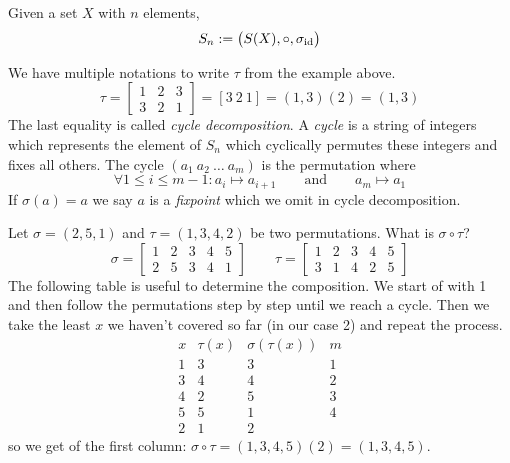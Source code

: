 \begin{definition}
   Given a set \(X\) with \(n\) elements,
   \[S_n := \big(S(X), \circ, \sigma_{\operatorname{id}}\big)\]
\end{definition}
\begin{remark}[Notation]
   We have multiple notations to write \(\tau\) from the example above.
   \[\tau = \begin{bmatrix}
         1 & 2 & 3\\
         3 & 2 & 1
   \end{bmatrix} = [3~2~1] = (1,3)(2) = (1,3)\]
   The last equality is called \emph{cycle decomposition}.
   A \emph{cycle} is a string of integers which represents the element of \(S_n\) which cyclically permutes these integers and fixes all others.
   The cycle \((a_1~a_2~\ldots~a_m)\) is the permutation where
   \[\forall 1 \leq i \leq m-1: a_i \mapsto a_{i+1} \qquad\text{and}\qquad a_m \mapsto a_1\]
   If \(\sigma(a) = a\) we say \(a\) is a \emph{fixpoint} which we omit in cycle decomposition.
\end{remark}
\begin{example}
   Let \(\sigma = (2, 5, 1)\) and \(\tau = (1, 3, 4, 2)\) be two permutations.
   What is \(\sigma \circ \tau\)?
      \[\sigma = \begin{bmatrix}1&2&3&4&5\\2&5&3&4&1\end{bmatrix} \qquad \tau = \begin{bmatrix}1&2&3&4&5\\3&1&4&2&5\end{bmatrix}\]
   The following table is useful to determine the composition.
   We start of with 1 and then follow the permutations step by step until we reach a cycle.
   Then we take the least \(x\) we haven't covered so far (in our case 2) and repeat the process.
   \[\begin{array}{c|c|c|c}
         x & \tau(x) & \sigma(\tau(x)) & m \\
         \hline
         1 & 3 & 3 & 1\\
         3 & 4 & 4 & 2\\
         4 & 2 & 5 & 3\\
         5 & 5 & 1 & 4\\
         \hline
         2 & 1 & 2
      \end{array}\]
      so we get of the first column: \(\sigma \circ \tau = (1, 3, 4, 5)(2) = (1, 3, 4, 5)\).
\end{example}

